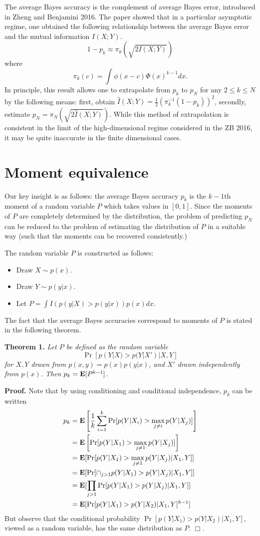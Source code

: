 \documentclass[12pt]{article}
\begin{document}
The average Bayes accuracy is the complement of average Bayes error,
 introduced in Zheng and Benjamini 2016.
The paper showed that in a particular asymptotic regime, one obtained the following relationship between
the average Bayes error and the mutual information $I(X;Y)$.
\[
1 - p_k \approx \pi_k(\sqrt{2I(X;Y)})
\]
where
\[
\pi_k(c) = \int \phi(x - c) \Phi(x)^{k-1} dx.
\]
In principle, this result allows one to extrapolate from $p_k$ to $p_N$ for any $2 \leq k \leq N$ by the following means: first, obtain $\hat{I}(X; Y) = \frac{1}{2}(\pi_k^{-1}(1-p_k))^2$,
secondly, estimate $p_N = \pi_N(\sqrt{2 \hat{I}(X; Y)})$.
While this method of extrapolation is consistent in the limit of the high-dimensional regime
considered in the ZB 2016, it may be quite inaccurate in the finite dimensional cases.

\section{Moment equivalence}

Our key insight is as follows: the average Bayes accuracy $p_k$ is the $k-1$th moment of a random variable $P$ which takes values in $[0,1]$.
Since the moments of $P$ are completely determined by the distribution,
the problem of predicting $p_N$ can be reduced to the problem of estimating the distribution of $P$
in a suitable way (such that the moments can be recovered consistently.)

The random variable $P$ is constructed as follows:
\begin{itemize}
\item Draw $X \sim p(x)$.
\item Draw $Y \sim p(y|x)$.
\item Let $P = \int I(p(y|X) > p(y|x)) p(x) dx.$
\end{itemize}

The fact that the average Bayes accuracies correspond to moments of $P$ is stated in the following theorem.

\noindent\textbf{Theorem 1.} \emph{
Let $P$ be defined as the random variable
\[\Pr[p(Y|X) > p(Y|X')|X, Y]\]
for $X, Y$ drawn from $p(x, y) = p(x) p(y|x)$,
and $X'$ drawn independently from $p(x)$.
Then $p_k = \textbf{E}[P^{k-1}]$.
}

\noindent\textbf{Proof.}
Note that by using conditioning and conditional independence, $p_k$ can be written
\begin{align*}
p_k &= \textbf{E}\left[ \frac{1}{k}\sum_{i=1}^k  \Pr[p(Y|X_i) > \max_{j\neq i} p(Y|X_j)] \right]
\\&= \textbf{E}\left[ \Pr[p(Y|X_1) > \max_{j\neq 1} p(Y|X_j)] \right]
\\&= \textbf{E}[\Pr[p(Y|X_1) > \max_{j\neq 1} p(Y|X_j)|X_1, Y]]
\\&= \textbf{E}[\Pr[\cap_{j > 1} p(Y|X_1) > p(Y|X_j)|X_1, Y]]
\\&= \textbf{E}[\prod_{j > 1}\Pr[p(Y|X_1) > p(Y|X_j)|X_1, Y]]
\\&= \textbf{E}[\Pr[p(Y|X_1) > p(Y|X_2)|X_1, Y]^{k-1}]
\end{align*}
But observe that the conditional probability $\Pr[p(Y|X_1) > p(Y|X_2)|X_1, Y]$, viewed as a random variable,
has the same distribution as $P$. $\Box$.
\end{document}
